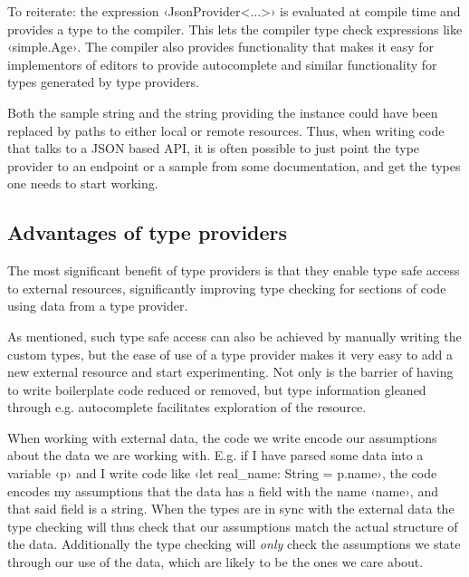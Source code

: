 To reiterate: the expression ‹JsonProvider<...>› is evaluated at compile time and provides a type to the compiler. This lets the compiler type check expressions like ‹simple.Age›. The compiler also provides functionality that makes it easy for implementors of editors to provide autocomplete and similar functionality for types generated by type providers.

Both the sample string and the string providing the instance could have been replaced by paths to either local or remote resources. Thus, when writing code that talks to a JSON based API, it is often possible to just point the type provider to an endpoint or a sample from some documentation, and get the types one needs to start working.

\subsection{Advantages of type providers}



The most significant benefit of type providers is that they enable type safe access to external resources, significantly improving type checking for sections of code using data from a type provider.


As mentioned, such type safe access can also be achieved by manually writing the custom types, but the ease of use of a type provider makes it very easy to add a new external resource and start experimenting. Not only is the barrier of having to write boilerplate code reduced or removed, but type information gleaned through e.g. autocomplete facilitates exploration of the resource.

When working with external data, the code we write encode our assumptions about the data we are working with. E.g. if I have parsed some data into a variable ‹p› and I write code like ‹let real_name: String = p.name›, the code encodes my assumptions that the data has a field with the name ‹name›, and that said field is a string. When the types are in sync with the external data the type checking will thus check that our assumptions match the actual structure of the data. Additionally the type checking will \emph{only} check the assumptions we state through our use of the data, which are likely to be the ones we care about.


